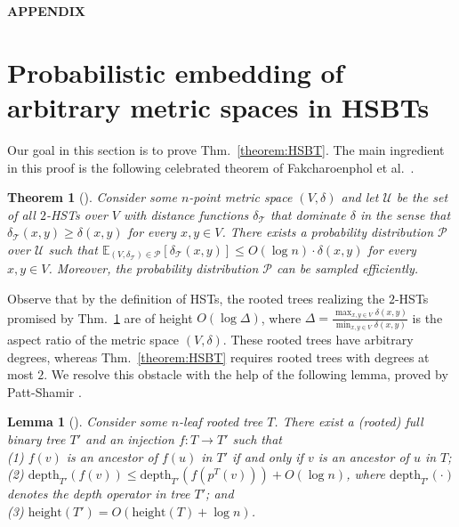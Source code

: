 \documentclass[11pt]{article}
\def\LongVersion{}
\newtheorem{theorem}{Theorem}[section]
\newtheorem{lemma}[theorem]{Lemma}
\theoremstyle{definition}
\theoremstyle{plain}
\newtheorem{theorem}{Theorem}
\newtheorem{lemma}[theorem]{Lemma}
\theoremstyle{definition}
\theoremstyle{plain}
\newtheorem{theorem}{Theorem}[section]
\newtheorem{lemma}{Lemma}[section]
\theoremstyle{definition}
\theoremstyle{plain}
\newcommand{\Thm}{Thm.}
\newcommand{\Expect}{\mathbb{E}}
\newcommand{\Depth}{\mathrm{depth}}
\newcommand{\Height}{\mathrm{height}}
\begin{document}
\LongVersion %
\clearpage
{}
\appendix

\renewcommand{\theequation}{A-\arabic{equation}}
\setcounter{equation}{0}

\begin{center}
\textbf{\large{APPENDIX}}
\end{center}

\section{Probabilistic embedding of arbitrary metric spaces in HSBTs}
\label{appendix:embedding-in-HSBT}
Our goal in this section is to prove \Thm{}~\ref{theorem:HSBT}.
The main ingredient in this proof is the following celebrated theorem of
Fakcharoenphol et al.~\cite{FakcharoenpholRT2004}.

\begin{theorem}[\cite{FakcharoenpholRT2004}] \label{theorem:FRT}
Consider some $n$-point metric space
$(V, \delta)$
and let $\mathcal{U}$ be the set of all $2$-HSTs over $V$ with distance
functions $\delta_{\mathcal{T}}$ that dominate $\delta$ in the sense that
$\delta_{\mathcal{T}}(x, y) \geq \delta(x, y)$
for every $x, y \in V$.
There exists a probability distribution $\mathcal{P}$ over $\mathcal{U}$ such
that
$\Expect_{(V, \delta_{\mathcal{T}}) \in \mathcal{P}}[\delta_{\mathcal{T}}(x, y)]
\leq
O (\log n) \cdot \delta(x, y)$
for every $x, y \in V$.
Moreover, the probability distribution $\mathcal{P}$ can be sampled
efficiently.
\end{theorem}

Observe that by the definition of HSTs, the rooted trees realizing the
$2$-HSTs promised by \Thm{}~\ref{theorem:FRT} are of height
$O (\log \Delta)$,
where
$\Delta = \frac{\max_{x, y \in V} \delta(x, y)}{\min_{x, y \in V} \delta(x, y)}$
is the aspect ratio of the metric space
$(V, \delta)$.
These rooted trees have arbitrary degrees, whereas \Thm{}~\ref{theorem:HSBT}
requires rooted trees with degrees at most $2$.
We resolve this obstacle with the help of the following lemma, proved by
Patt-Shamir \cite{PattShamir2015}.

\begin{lemma}[\cite{PattShamir2015}] \label{lemma:Boaz}
Consider some $n$-leaf rooted tree $T$.
There exist
a (rooted) full binary tree $T'$ and an injection
$f : T \rightarrow T'$
such that \\
(1)
$f(v)$ is an ancestor of $f(u)$ in $T'$ if and only if $v$ is an ancestor of
$u$ in $T$; \\
(2)
$\Depth_{T'}(f(v)) \leq \Depth_{T'}(f(p^{T}(v))) + O (\log n)$, where
$\Depth_{T'}(\cdot)$ denotes the depth operator in tree $T'$; and \\
(3)
$\Height(T') = O (\Height(T) + \log n)$.
\end{lemma}
\end{document}
